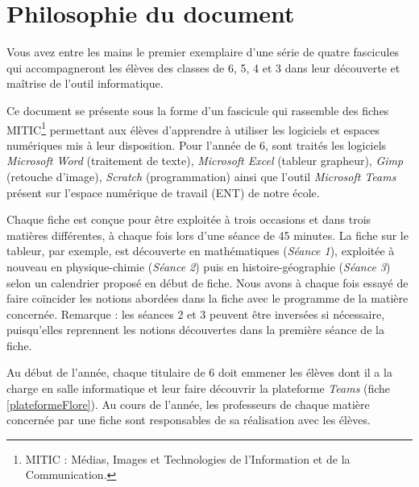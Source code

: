 \chapter*{Philosophie du document}



Vous avez entre les mains le premier exemplaire d'une série de quatre fascicules qui accompagneront les élèves des classes de 6, 5, 4 et 3 dans leur découverte et maîtrise de l'outil informatique.

\vspace{18pt}

Ce document se présente sous la forme d'un fascicule qui rassemble des fiches MITIC\footnote{MITIC : Médias, Images et Technologies de l'Information et de la Communication.} permettant aux élèves d'apprendre à utiliser les logiciels et espaces numériques mis à leur disposition. Pour l'année de 6, sont traités les logiciels \emph{Microsoft Word} (traitement de texte), \emph{Microsoft Excel} (tableur grapheur), \emph{Gimp} (retouche d'image), \emph{Scratch} (programmation) ainsi que l'outil \emph{Microsoft Teams} présent sur l'espace numérique de travail (ENT) de notre école. %

\vspace{18pt}


Chaque fiche est conçue pour être exploitée à trois occasions et dans trois matières différentes, à chaque fois lors d'une séance de 45 minutes. La fiche sur le tableur, par exemple, est découverte en mathématiques (\emph{Séance 1}), exploitée à nouveau en physique-chimie (\emph{Séance 2}) puis en histoire-géographie (\emph{Séance 3}) selon un calendrier proposé en début de fiche. Nous avons à chaque fois essayé de faire coïncider les notions abordées dans la fiche avec le programme de la matière concernée. Remarque : les séances 2 et 3 peuvent être inversées si nécessaire, puisqu'elles reprennent les notions découvertes dans la première séance de la fiche.

\vspace{18pt}

Au début de l'année, chaque titulaire de 6 doit emmener les élèves dont il a la charge en salle informatique et leur faire découvrir la plateforme \emph{Teams} (fiche \vref{plateformeFlore}). Au cours de l'année, les professeurs de chaque matière concernée par une fiche sont responsables de sa réalisation avec les élèves.


